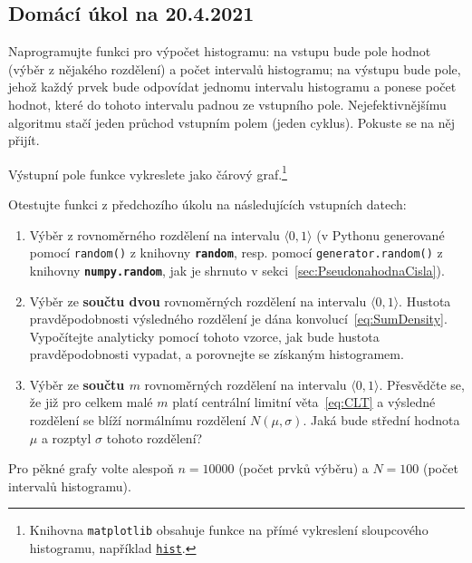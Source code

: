 \documentclass[a4paper,11pt,twoside]{article}
\def\code#1{\textnormal{\texttt{#1}}}
\def\file#1{\textnormal{\textbf{\texttt{#1}}}}
\theoremstyle{red}
\theoremstyle{green}
\begin{document}
\newpage
{\color{red}\subsection{Domácí úkol na 20.4.2021}}
        \begin{task}
            Naprogramujte funkci pro výpočet histogramu: na vstupu bude pole hodnot (výběr z nějakého rozdělení) a počet intervalů histogramu; na výstupu bude pole, jehož každý prvek bude odpovídat jednomu intervalu histogramu a ponese počet hodnot, které do tohoto intervalu padnou ze vstupního pole.
            Nejefektivnějšímu algoritmu stačí jeden průchod vstupním polem (jeden cyklus). 
            Pokuste se na něj přijít.
    
            Výstupní pole funkce vykreslete jako čárový graf.\footnote{
                Knihovna \code{matplotlib} obsahuje funkce na přímé vykreslení sloupcového histogramu, například \code{\href{https://matplotlib.org/stable/api/_as_gen/matplotlib.pyplot.hist.html}{hist}}.
            }
        \end{task}
    
        \begin{task}\label{task:Distribution}
            Otestujte funkci z předchozího úkolu na následujících vstupních datech:
            \begin{enumerate}
                \item
                    Výběr z rovnoměrného rozdělení na intervalu $\langle 0,1\rangle$ (v Pythonu generované pomocí \code{random()} z knihovny \file{random}, resp. pomocí \code{generator.random()} z knihovny \file{numpy.random}, jak je shrnuto v sekci~\ref{sec:PseudonahodnaCisla}).
                \item
                    Výběr ze {\bf součtu dvou} rovnoměrných rozdělení na intervalu $\langle 0,1\rangle$.
                    Hustota pravděpodobnosti výsledného rozdělení je dána konvolucí~\eqref{eq:SumDensity}.
                    Vypočítejte analyticky pomocí tohoto vzorce, jak bude hustota pravděpodobnosti vypadat, a porovnejte se získaným histogramem.
                \item
                    Výběr ze {\bf součtu $m$} rovnoměrných rozdělení na intervalu $\langle 0,1\rangle$.
                    Přesvědčte se, že již pro celkem malé $m$ platí centrální limitní věta~\eqref{eq:CLT} a výsledné rozdělení se blíží normálnímu rozdělení $N(\mu,\sigma)$.
                    Jaká bude střední hodnota $\mu$ a rozptyl $\sigma$ tohoto rozdělení?
            \end{enumerate}
            Pro pěkné grafy volte alespoň $n=10000$ (počet prvků výběru) a $N=100$ (počet intervalů histogramu).
        \end{task}
    
\end{document}
